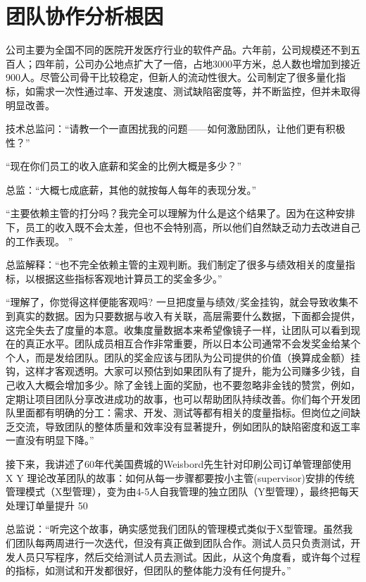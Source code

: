\chapter{团队协作分析根因} %

公司主要为全国不同的医院开发医疗行业的软件产品。六年前，公司规模还不到五百人；四年前，公司办公地点扩大了一倍，占地3000平方米，总人数也增加到接近900人。尽管公司骨干比较稳定，但新人的流动性很大。公司制定了很多量化指标，如需求一次性通过率、开发速度、测试缺陷密度等，并不断监控，但并未取得明显改善。

技术总监问：“请教一个一直困扰我的问题——如何激励团队，让他们更有积极性？”

“现在你们员工的收入底薪和奖金的比例大概是多少？”

总监：“大概七成底薪，其他的就按每人每年的表现分发。”

“主要依赖主管的打分吗？我完全可以理解为什么是这个结果了。因为在这种安排下，员工的收入既不会太差，但也不会特别高，所以他们自然缺乏动力去改进自己的工作表现。 ”

总监解释：“也不完全依赖主管的主观判断。我们制定了很多与绩效相关的度量指标，以根据这些指标客观地计算员工的奖金多少。”

“理解了，你觉得这样便能客观吗? 一旦把度量与绩效/奖金挂钩，就会导致收集不到真实的数据。因为只要数据与收入有关联，高层需要什么数据，下面都会提供，这完全失去了度量的本意。收集度量数据本来希望像镜子一样，让团队可以看到现在的真正水平。团队成员相互合作非常重要，所以日本公司通常不会发奖金给某个个人，而是发给团队。团队的奖金应该与团队为公司提供的价值（换算成金额）挂钩，这样才客观透明。大家可以预估到如果团队有了提升，能为公司赚多少钱，自己收入大概会增加多少。除了金钱上面的奖励，也不要忽略非金钱的赞赏，例如，定期让项目团队分享改进成功的故事，也可以帮助团队持续改善。你们每个开发团队里面都有明确的分工：需求、开发、测试等都有相关的度量指标。但岗位之间缺乏交流，导致团队的整体质量和效率没有显著提升，例如团队的缺陷密度和返工率一直没有明显下降。”

接下来，我讲述了60年代美国费城的Weisbord先生针对印刷公司订单管理部使用 X Y 理论改革团队的故事：如何从每一步骤都要按小主管(supervisor)安排的传统管理模式（X型管理），变为由4-5人自我管理的独立团队（Y型管理），最终把每天处理订单量提升 50%

总监说：“听完这个故事，确实感觉我们团队的管理模式类似于X型管理。虽然我们团队每两周进行一次迭代，但没有真正做到团队合作。测试人员只负责测试，开发人员只写程序，然后交给测试人员去测试。因此，从这个角度看，或许每个过程的指标，如测试和开发都很好，但团队的整体能力没有任何提升。”

